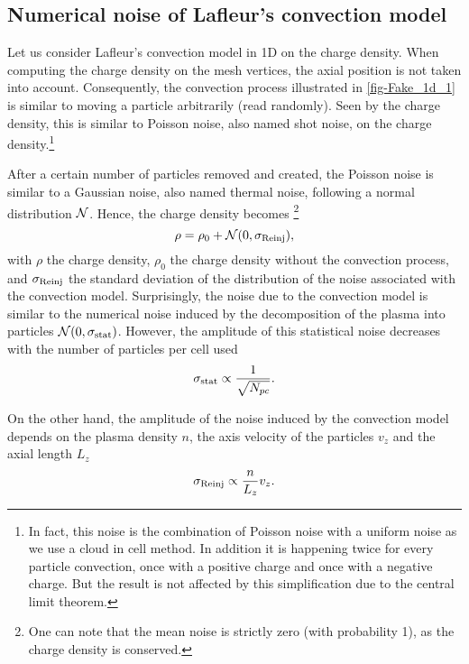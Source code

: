   \subsection{Numerical noise of Lafleur's convection model}

    Let us consider Lafleur's convection model in \ac{1D} on the charge density.
    When computing the charge density on the mesh vertices, the axial position is not taken into account.
    Consequently, the convection process illustrated in \cref{fig-Fake_1d_1} is similar to moving a particle arbitrarily (read randomly).
    Seen by the charge density, this is similar to Poisson noise, also named shot noise, on the charge density.\footnote{In fact, this noise is the combination of Poisson noise with a uniform noise as we use a cloud in cell method. In addition it is happening twice for every particle convection, once with a positive charge and once with a negative charge. But the result is not affected by this simplification due to the central limit theorem.}

    After a certain number of particles removed and created, the Poisson noise is similar to a Gaussian noise, also named thermal noise, following a normal distribution $\mathcal{N}$. 
    Hence, the charge density becomes \footnote{One can note that the mean noise is strictly zero (with probability 1), as the charge density is conserved.}
    \begin{equation} \label{eq-rhonoise}
      \rho = \rho_0 + \mathcal{N}(0, \sigma_{\rm Reinj}),
    \end{equation}
    with $\rho$ the charge density, $\rho_0$ the charge density without the convection process, and $\sigma_{\rm Reinj}$ the standard deviation of the distribution of the noise associated with the convection model.
    Surprisingly, the noise due to the convection model is similar to the numerical noise induced by the decomposition of the plasma into particles $\mathcal{N}(0, \sigma_{\rm stat})$.
    However, the amplitude of this statistical noise decreases with the number of particles per cell used
    \begin{equation*} \label{eq-statistical}
     \sigma_{\rm stat} \propto \frac{1}{\sqrt{N_{pc}}}.
    \end{equation*}

    On the other hand, the amplitude of the noise induced by the convection model depends on the plasma density $n$, the axis velocity of the particles $v_z$ and the axial length $L_z$
    \begin{equation} \label{eq-convstd}
     \sigma_{\rm Reinj} \propto \frac{n}{L_z} v_z.
    \end{equation}

